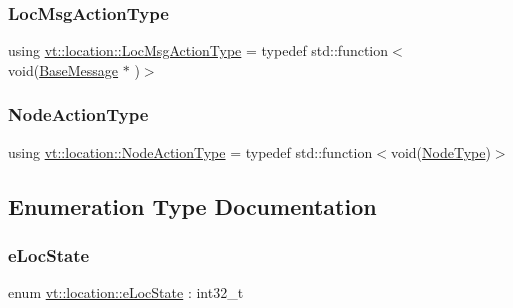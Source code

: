 \subsubsection{\texorpdfstring{Loc\+Msg\+Action\+Type}{LocMsgActionType}}
{\footnotesize\ttfamily using \hyperlink{namespacevt_1_1location_ad0a130e4d79e745543925240e13e8f08}{vt\+::location\+::\+Loc\+Msg\+Action\+Type} = typedef std\+::function$<$void(\hyperlink{namespacevt_ac34f95a5e2b8109b55bfba52b074443d}{Base\+Message} $\ast$ )$>$}

\mbox{\label{namespacevt_1_1location_a3a9235e0ceb341bef225d2cc46606e9e}} 
\subsubsection{\texorpdfstring{Node\+Action\+Type}{NodeActionType}}
{\footnotesize\ttfamily using \hyperlink{namespacevt_1_1location_a3a9235e0ceb341bef225d2cc46606e9e}{vt\+::location\+::\+Node\+Action\+Type} = typedef std\+::function$<$void(\hyperlink{namespacevt_a866da9d0efc19c0a1ce79e9e492f47e2}{Node\+Type})$>$}



\subsection{Enumeration Type Documentation}
\mbox{\label{namespacevt_1_1location_a7a5c74aad68cf57281515029d8521547}} 
\subsubsection{\texorpdfstring{e\+Loc\+State}{eLocState}}
{\footnotesize\ttfamily enum \hyperlink{namespacevt_1_1location_a7a5c74aad68cf57281515029d8521547}{vt\+::location\+::e\+Loc\+State} \+: int32\+\_\+t\hspace{0.3cm}{\ttfamily [strong]}}

